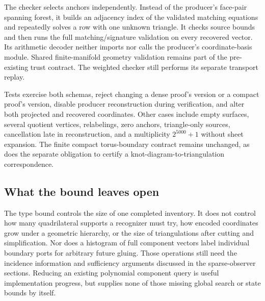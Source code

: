 The checker selects anchors independently. Instead of the producer's
face-pair spanning forest, it builds an adjacency index of the validated
matching equations and repeatedly solves a row with one unknown triangle.
It checks source bounds and then runs the full matching/signature validation
on every recovered vector. Its arithmetic decoder neither imports nor calls
the producer's coordinate-basis module. Shared finite-manifold geometry
validation remains part of the pre-existing trust contract. The weighted
checker still performs its separate transport replay.

Tests exercise both schemas, reject changing a dense proof's version or a
compact proof's version, disable producer reconstruction during verification,
and alter both projected and recovered coordinates. Other cases include
empty surfaces, several quotient vertices, relabelings, zero anchors,
triangle-only sources, cancellation late in reconstruction, and a multiplicity
$2^{5000}+1$ without sheet expansion. The finite compact torus-boundary
contract remains unchanged, as does the separate obligation to certify a
knot-diagram-to-triangulation correspondence.

\subsection{What the bound leaves open}

The type bound controls the size of one completed inventory. It does not
control how many quadrilateral supports a recognizer must try, how encoded
coordinates grow under a geometric hierarchy, or the size of triangulations
after cutting and simplification. Nor does a histogram of full component
vectors label individual boundary ports for arbitrary future gluing. Those
operations still need the incidence information and sufficiency arguments
discussed in the sparse-observer sections. Reducing an existing polynomial
component query is useful implementation progress, but supplies none of those
missing global search or state bounds by itself.



